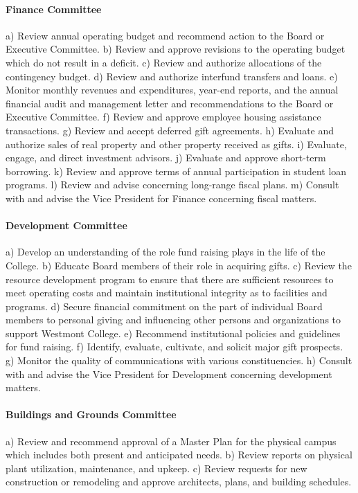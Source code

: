 \documentclass[letterpaper, 11pt]{article}
\begin{document}
			\paragraph{Finance Committee}
				a) Review annual operating budget and recommend action to the Board or Executive Committee.
				b) Review and approve revisions to the operating budget which do not result in a deficit.
				c) Review and authorize allocations of the contingency budget.
				d) Review and authorize interfund transfers and loans.
				e) Monitor monthly revenues and expenditures, year-end reports, and the annual financial audit and management letter and recommendations to the Board or Executive Committee.
				f) Review and approve employee housing assistance transactions.
				g) Review and accept deferred gift agreements.
				h) Evaluate and authorize sales of real property and other property received as gifts.
				i) Evaluate, engage, and direct investment advisors.
				j) Evaluate and approve short-term borrowing.
				k) Review and approve terms of annual participation in student loan programs.
				l) Review and advise concerning long-range fiscal plans.
				m) Consult with and advise the Vice President for Finance concerning fiscal matters.
			\paragraph{Development Committee}
				a) Develop an understanding of the role fund raising plays in the life of the College.
				b) Educate Board members of their role in acquiring gifts.
				c) Review the resource development program to ensure that there are sufficient resources to meet operating costs and maintain institutional integrity as to facilities and programs.
				d) Secure financial commitment on the part of individual Board members to personal giving and influencing other persons and organizations to support Westmont College.
				e) Recommend institutional policies and guidelines for fund raising.
				f) Identify, evaluate, cultivate, and solicit major gift prospects.
				g) Monitor the quality of communications with various constituencies.
				h) Consult with and advise the Vice President for Development concerning development matters.
			\paragraph{Buildings and Grounds Committee}
				a) Review and recommend approval of a Master Plan for the physical campus which includes both present and anticipated needs.
				b) Review reports on physical plant utilization, maintenance, and upkeep.
				c) Review requests for new construction or remodeling and approve architects, plans, and building schedules.
\end{document}
